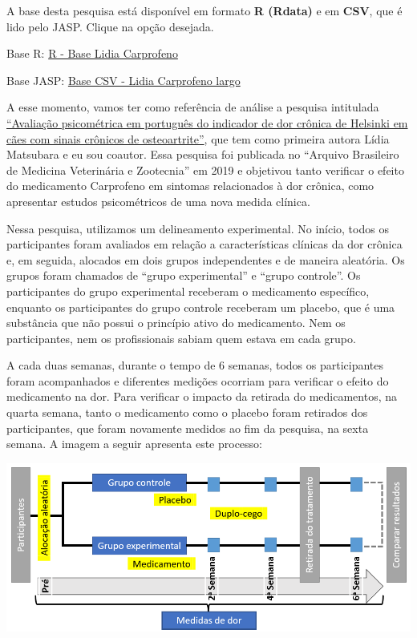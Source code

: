 \documentclass[
]{book}
\begin{document}
\begin{base}

A base desta pesquisa está disponível em formato \textbf{R (Rdata)} e em
\textbf{CSV}, que é lido pelo JASP. Clique na opção desejada.

Base R:
\href{https://github.com/anovabr/mqt/raw/master/bases/R\%20-\%20Base\%20Lidia\%20Carprofeno.RData}{R
- Base Lidia Carprofeno}

Base JASP:
\href{https://github.com/anovabr/mqt/raw/master/bases/bases_csv_jasp.zip}{Base
CSV - Lidia Carprofeno largo}

\end{base}

A esse momento, vamos ter como referência de análise a pesquisa
intitulada
\href{https://www.scielo.br/scielo.php?script=sci_arttext\&pid=S0102-09352019000100109}{``Avaliação
psicométrica em português do indicador de dor crônica de Helsinki em
cães com sinais crônicos de osteoartrite''}, que tem como primeira
autora Lídia Matsubara e eu sou coautor. Essa pesquisa foi publicada no
``Arquivo Brasileiro de Medicina Veterinária e Zootecnia'' em 2019 e
objetivou tanto verificar o efeito do medicamento Carprofeno em sintomas
relacionados à dor crônica, como apresentar estudos psicométricos de uma
nova medida clínica.

Nessa pesquisa, utilizamos um delineamento experimental. No início,
todos os participantes foram avaliados em relação a características
clínicas da dor crônica e, em seguida, alocados em dois grupos
independentes e de maneira aleatória. Os grupos foram chamados de
``grupo experimental'' e ``grupo controle''. Os participantes do grupo
experimental receberam o medicamento específico, enquanto os
participantes do grupo controle receberam um placebo, que é uma
substância que não possui o princípio ativo do medicamento. Nem os
participantes, nem os profissionais sabiam quem estava em cada grupo.

A cada duas semanas, durante o tempo de 6 semanas, todos os
participantes foram acompanhados e diferentes medições ocorriam para
verificar o efeito do medicamento na dor. Para verificar o impacto da
retirada do medicamentos, na quarta semana, tanto o medicamento como o
placebo foram retirados dos participantes, que foram novamente medidos
ao fim da pesquisa, na sexta semana. A imagem a seguir apresenta este
processo:

\includegraphics{./img/delineamento_experimental.png}
\end{document}
